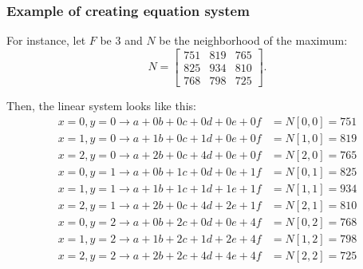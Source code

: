 \subsubsection{Example of creating equation system}

For instance, let $F$ be 3 and $N$ be the neighborhood of the maximum:
\[
N =
\begin{bmatrix}
751 & 819 & 765 \\
825 & 934 & 810 \\
768 & 798 & 725
\end{bmatrix}.
\]

Then, the linear system looks like this:
\begin{align*}
x=0,y=0 \rightarrow a + 0b + 0c + 0d + 0e + 0f &= N[0,0] = 751 \\
x=1,y=0 \rightarrow a + 1b + 0c + 1d + 0e + 0f &= N[1,0] = 819 \\
x=2,y=0 \rightarrow a + 2b + 0c + 4d + 0e + 0f &= N[2,0] = 765 \\
x=0,y=1 \rightarrow a + 0b + 1c + 0d + 0e + 1f &= N[0,1] = 825 \\
x=1,y=1 \rightarrow a + 1b + 1c + 1d + 1e + 1f &= N[1,1] = 934 \\
x=2,y=1 \rightarrow a + 2b + 0c + 4d + 2e + 1f &= N[2,1] = 810 \\
x=0,y=2 \rightarrow a + 0b + 2c + 0d + 0e + 4f &= N[0,2] = 768 \\
x=1,y=2 \rightarrow a + 1b + 2c + 1d + 2e + 4f &= N[1,2] = 798 \\
x=2,y=2 \rightarrow a + 2b + 2c + 4d + 4e + 4f &= N[2,2] = 725 \\
\end{align*}

